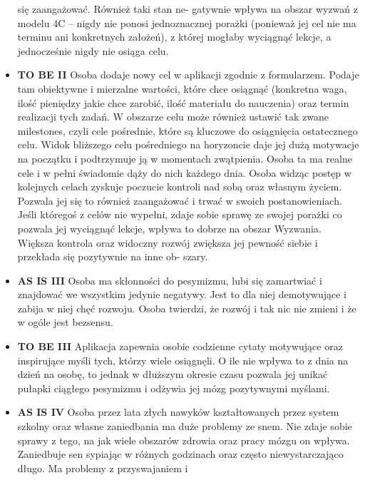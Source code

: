 \begin{itemize}
          się zaangażować. Również taki stan ne- gatywnie wpływa na obszar
          wyzwań z modelu 4C – nigdy nie ponosi jednoznacznej porażki (ponieważ
          jej cel nie ma terminu ani konkretnych założeń), z której mogłaby
          wyciągnąć lekcje, a jednocześnie nigdy nie osiąga celu.
    \item \textbf{TO BE II} Osoba dodaje nowy cel w aplikacji zgodnie z
          formularzem. Podaje tam obiektywne i mierzalne wartości, które chce
          osiągnąć (konkretna waga, ilość pieniędzy jakie chce zarobić, ilość
          materiału do nauczenia) oraz termin realizacji tych zadań. W obszarze
          celu może również ustawić tak zwane milestones, czyli cele pośrednie,
          które są kluczowe do osiągnięcia ostatecznego celu. Widok bliższego
          celu pośredniego na horyzoncie daje jej dużą motywacje na początku i
          podtrzymuje ją w momentach zwątpienia. Osoba ta ma realne cele i w
          pełni świadomie dąży do nich każdego dnia. Osoba widząc postęp w
          kolejnych celach zyskuje poczucie kontroli nad sobą oraz własnym
          życiem. Pozwala jej się to również zaangażować i trwać w swoich
          postanowieniach. Jeśli któregoś z celów nie wypełni, zdaje sobie
          sprawę ze swojej porażki co pozwala jej wyciągnąć lekcje, wpływa to
          dobrze na obszar Wyzwania. Większa kontrola oraz widoczny rozwój
          zwiększa jej pewność siebie i przekłada się pozytywnie na inne ob-
          szary.
    \item \textbf{AS IS III} Osoba ma skłonności do pesymizmu, lubi się
          zamartwiać i znajdować we wszystkim jedynie negatywy. Jest to dla niej
          demotywujące i zabija w niej chęć rozwoju. Osoba twierdzi, że rozwój i
          tak nic nie zmieni i że w ogóle jest bezsensu.
    \item \textbf{TO BE III} Aplikacja zapewnia osobie codzienne cytaty
          motywujące oraz inspirujące myśli tych, którzy wiele osiągnęli. O ile
          nie wpływa to z dnia na dzień na osobę, to jednak w dłuższym okresie
          czasu pozwala jej unikać pułapki ciągłego pesymizmu i odżywia jej mózg
          pozytywnymi myślami.
    \item \textbf{AS IS IV} Osoba przez lata złych nawyków kształtowanych przez
          system szkolny oraz własne zaniedbania ma duże problemy ze snem. Nie
          zdaje sobie sprawy z tego, na jak wiele obszarów zdrowia oraz pracy
          mózgu on wpływa. Zaniedbuje sen sypiając w różnych godzinach oraz
          często niewystarczająco długo. Ma problemy z przyswajaniem i

\end{itemize}
